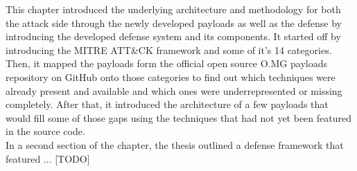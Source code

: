 This chapter introduced the underlying architecture and methodology for both the attack side through the newly developed payloads as well as the defense by introducing the developed defense system and its components. 
It started off by introducing the MITRE ATT\&CK framework and some of it's 14 categories. Then, it mapped the payloads form the official open source O.MG payloads repository on GitHub onto those categories to find out which techniques were already present and available and which ones were underrepresented or missing completely. After that, it introduced the architecture of a few payloads that would fill some of those gaps using the techniques that had not yet been featured in the source code. \\
In a second section of the chapter, the thesis outlined a defense framework that featured ... [TODO]



